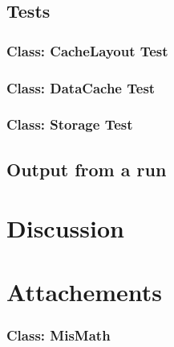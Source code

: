 \documentclass[a4paper]{scrreprt}
\begin{document}
\section{Tests}

\subsection{Class: CacheLayout Test}
\label{subsec:cachelayouttest.java}


\subsection{Class: DataCache Test}
\label{subsec:datacachetest.java}


\subsection{Class: Storage Test}
\label{subsec:storagetest.java}


\section{Output from a run}


\chapter{Discussion}

\chapter{Attachements}

\subsection{Class: MisMath}
\label{subsec:mismath.java}

\end{document}
